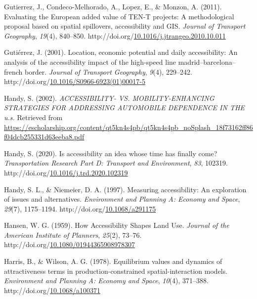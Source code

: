\documentclass[
11pt, %
oneside, %
english, %
singlespacing, %
]{macthesis} %
\newlength{\cslhangindent}
\newenvironment{CSLReferences}[2] %
{\begin{list}{}{%
	\setlength{\itemindent}{0pt}
	\setlength{\leftmargin}{0pt}
	\setlength{\parsep}{0pt}
	\ifodd #1
	\setlength{\leftmargin}{\cslhangindent}
	\setlength{\itemindent}{-1\cslhangindent}
	\fi
	\setlength{\itemsep}{#2\baselineskip}}}
{\end{list}}
\begin{document}
\begin{CSLReferences}{1}{0}
Gutierrez, J., Condeco-Melhorado, A., Lopez, E., \& Monzon, A. (2011). Evaluating the {European} added value of {TEN}-{T} projects: A methodological proposal based on spatial spillovers, accessibility and {GIS}. \emph{Journal of Transport Geography}, \emph{19}(4), 840--850. http://doi.org/\href{https://doi.org/10.1016/j.jtrangeo.2010.10.011}{10.1016/j.jtrangeo.2010.10.011}

Gutiérrez, J. (2001). Location, economic potential and daily accessibility: An analysis of the accessibility impact of the high-speed line madrid--barcelona--french border. \emph{Journal of Transport Geography}, \emph{9}(4), 229--242. http://doi.org/\href{https://doi.org/10.1016/S0966-6923(01)00017-5}{10.1016/S0966-6923(01)00017-5}

Handy, S. (2002). \emph{{ACCESSIBILITY}- {VS}. {MOBILITY}-{ENHANCING} {STRATEGIES} {FOR} {ADDRESSING} {AUTOMOBILE} {DEPENDENCE} {IN} {THE} u.s.} Retrieved from \url{https://escholarship.org/content/qt5kn4s4pb/qt5kn4s4pb_noSplash_18f73162ff86f04dcb255331d63eeba8.pdf}

Handy, S. (2020). Is accessibility an idea whose time has finally come? \emph{Transportation Research Part D: Transport and Environment}, \emph{83}, 102319. http://doi.org/\href{https://doi.org/10.1016/j.trd.2020.102319}{10.1016/j.trd.2020.102319}

Handy, S. L., \& Niemeier, D. A. (1997). Measuring accessibility: An exploration of issues and alternatives. \emph{Environment and Planning A: Economy and Space}, \emph{29}(7), 1175--1194. http://doi.org/\href{https://doi.org/10.1068/a291175}{10.1068/a291175}

Hansen, W. G. (1959). How Accessibility Shapes Land Use. \emph{Journal of the American Institute of Planners}, \emph{25}(2), 73--76. http://doi.org/\href{https://doi.org/10.1080/01944365908978307}{10.1080/01944365908978307}

Harris, B., \& Wilson, A. G. (1978). Equilibrium values and dynamics of attractiveness terms in production-constrained spatial-interaction models. \emph{Environment and Planning A: Economy and Space}, \emph{10}(4), 371--388. http://doi.org/\href{https://doi.org/10.1068/a100371}{10.1068/a100371}


\end{CSLReferences}
\end{document}
